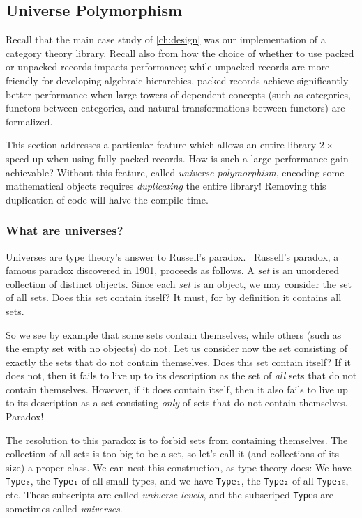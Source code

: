\subsection{Universe Polymorphism}\label{sec:fixes:theory:univ-poly}\label{sec:univ-poly}

Recall that the main case study of \autoref{ch:design} was our implementation of a category theory library.
Recall also from  how the choice of whether to use packed or unpacked records impacts performance; while unpacked records are more friendly for developing algebraic hierarchies, packed records achieve significantly better performance when large towers of dependent concepts (such as categories, functors between categories, and natural transformations between functors) are formalized.

This section addresses a particular feature which allows an entire-library $2\times$ speed-up when using fully-packed records.
How is such a large performance gain achievable?
Without this feature, called \emph{universe polymorphism}, encoding some mathematical objects requires \emph{duplicating} the entire library!
Removing this duplication of code will halve the compile-time.

\subsubsection{What are universes?}\label{sec:universes-def}
Universes are type theory's answer to Russell's paradox.~\cite{sep-russell-paradox}
Russell's paradox, a famous paradox discovered in 1901, proceeds as follows.
A \emph{set} is an unordered collection of distinct objects.
Since each \emph{set} is an object, we may consider the set of all sets.
Does this set contain itself?
It must, for by definition it contains all sets.

So we see by example that some sets contain themselves, while others (such as the empty set with no objects) do not.
Let us consider now the set consisting of exactly the sets that do not contain themselves.
Does this set contain itself?
If it does not, then it fails to live up to its description as the set of \emph{all} sets that do not contain themselves.
However, if it does contain itself, then it also fails to live up to its description as a set consisting \emph{only} of sets that do not contain themselves.
Paradox!

The resolution to this paradox is to forbid sets from containing themselves.
The collection of all sets is too big to be a set, so let's call it (and collections of its size) a proper class.
We can nest this construction, as type theory does:
We have \texttt{Type₀}, the \texttt{Type₁} of all small types, and we have \texttt{Type₁}, the \texttt{Type₂} of all \texttt{Type₁}s, etc.
These subscripts are called \emph{universe levels}, and the subscriped \texttt{Type}s are sometimes called \emph{universes}.

